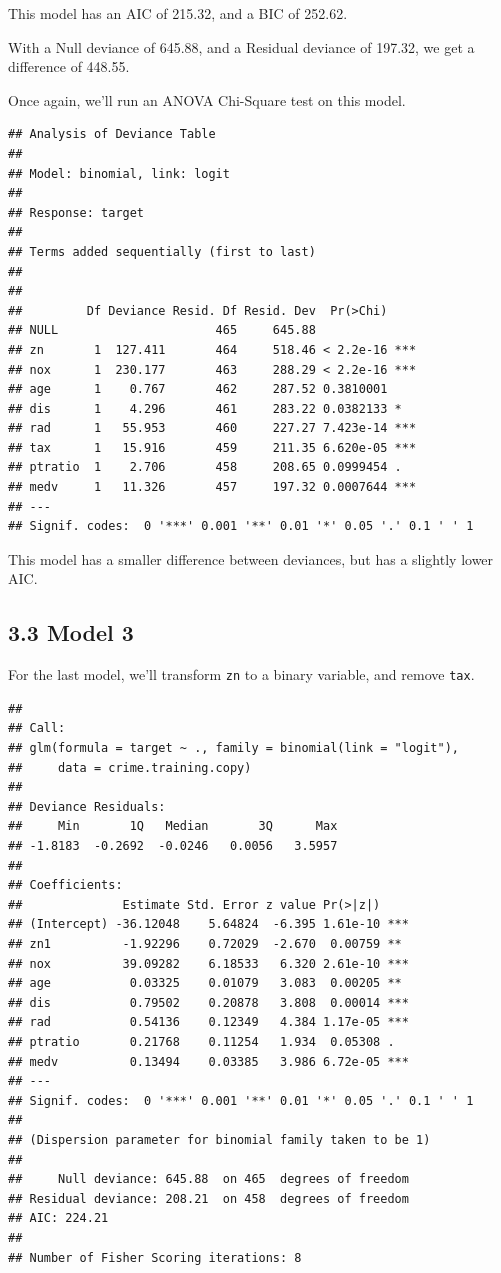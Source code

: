 \documentclass[]{article}
\begin{document}

This model has an AIC of 215.32, and a BIC of 252.62.

With a Null deviance of 645.88, and a Residual deviance of 197.32, we
get a difference of 448.55.

Once again, we'll run an ANOVA Chi-Square test on this model.

\begin{verbatim}
## Analysis of Deviance Table
## 
## Model: binomial, link: logit
## 
## Response: target
## 
## Terms added sequentially (first to last)
## 
## 
##         Df Deviance Resid. Df Resid. Dev  Pr(>Chi)    
## NULL                      465     645.88              
## zn       1  127.411       464     518.46 < 2.2e-16 ***
## nox      1  230.177       463     288.29 < 2.2e-16 ***
## age      1    0.767       462     287.52 0.3810001    
## dis      1    4.296       461     283.22 0.0382133 *  
## rad      1   55.953       460     227.27 7.423e-14 ***
## tax      1   15.916       459     211.35 6.620e-05 ***
## ptratio  1    2.706       458     208.65 0.0999454 .  
## medv     1   11.326       457     197.32 0.0007644 ***
## ---
## Signif. codes:  0 '***' 0.001 '**' 0.01 '*' 0.05 '.' 0.1 ' ' 1
\end{verbatim}

This model has a smaller difference between deviances, but has a
slightly lower AIC.

\subsection{3.3 Model 3}\label{model-3}

For the last model, we'll transform \texttt{zn} to a binary variable,
and remove \texttt{tax}.

\begin{verbatim}
## 
## Call:
## glm(formula = target ~ ., family = binomial(link = "logit"), 
##     data = crime.training.copy)
## 
## Deviance Residuals: 
##     Min       1Q   Median       3Q      Max  
## -1.8183  -0.2692  -0.0246   0.0056   3.5957  
## 
## Coefficients:
##              Estimate Std. Error z value Pr(>|z|)    
## (Intercept) -36.12048    5.64824  -6.395 1.61e-10 ***
## zn1          -1.92296    0.72029  -2.670  0.00759 ** 
## nox          39.09282    6.18533   6.320 2.61e-10 ***
## age           0.03325    0.01079   3.083  0.00205 ** 
## dis           0.79502    0.20878   3.808  0.00014 ***
## rad           0.54136    0.12349   4.384 1.17e-05 ***
## ptratio       0.21768    0.11254   1.934  0.05308 .  
## medv          0.13494    0.03385   3.986 6.72e-05 ***
## ---
## Signif. codes:  0 '***' 0.001 '**' 0.01 '*' 0.05 '.' 0.1 ' ' 1
## 
## (Dispersion parameter for binomial family taken to be 1)
## 
##     Null deviance: 645.88  on 465  degrees of freedom
## Residual deviance: 208.21  on 458  degrees of freedom
## AIC: 224.21
## 
## Number of Fisher Scoring iterations: 8
\end{verbatim}
\end{document}
